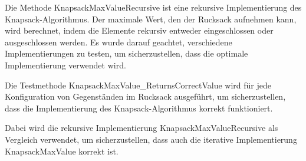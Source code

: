 Die Methode KnapsackMaxValueRecursive ist eine rekursive Implementierung des Knapsack-Algorithmus. Der maximale Wert, den
der Rucksack aufnehmen kann, wird berechnet, indem die Elemente rekursiv entweder eingeschlossen oder ausgeschlossen werden.
Es wurde darauf geachtet, verschiedene Implementierungen zu testen, um sicherzustellen, dass die optimale Implementierung verwendet wird.

Die Testmethode KnapsackMaxValue_ReturnsCorrectValue wird für jede Konfiguration von Gegenständen im Rucksack ausgeführt,
um sicherzustellen, dass die Implementierung des Knapsack-Algorithmus korrekt funktioniert.

Dabei wird die rekursive Implementierung KnapsackMaxValueRecursive als Vergleich verwendet, um sicherzustellen, dass
auch die iterative Implementierung KnapsackMaxValue korrekt ist.


